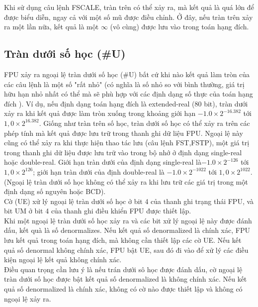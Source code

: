 	Khi sử dụng câu lệnh FSCALE, tràn trên có thể xảy ra, mà kết quả là quá lớn để được biểu diễn, ngay cả với một số mũ được điều chỉnh. Ở đây, nếu tràn trên xảy ra một lần nữa, kết quả là một $\mathbb{\infty}$ (vô cùng) được lưu vào trong toán hạng đích.	
	
		\subsection*{Tràn dưới số học (\#U)}
		FPU xảy ra ngoại lệ tràn dưới số học (\#U) bất cứ khi nào kết quả làm tròn của các câu lệnh là một số "rất nhỏ" (có nghĩa là số nhỏ so với bình thường, giá trị hữu hạn nhỏ nhất có thể mà sẽ phù hợp với các định dạng số thực của toán hạng đích ). Ví dụ, nếu định dạng toán hạng đích là extended-real (80 bit), tràn dưới xảy ra khi kết quả được làm tròn xuống trong khoảng giới hạn $-1.0 \times 2^{-16.382}$ tới $1,0 \times 2^{16.382}$. Giống như tràn trên số học, tràn dưới số học có thể xảy ra trên các phép tính mà kết quả được lưu trữ trong thanh ghi dữ liệu FPU. Ngoại lệ này cũng có thể xảy ra khi thực hiện thao tác lưu (câu lệnh FST,FSTP),  một giá trị trong thanh ghi dữ liệu được lưu trữ vào trong bộ nhớ ở định dạng single-real hoặc double-real. Giới hạn tràn dưới của định dạng single-real là$-1.0 \times 2^{-126}$ tới $1,0 \times 2^{126}$; giới hạn tràn dưới của định double-real là $-1.0 \times 2^{-1022}$ tới $1,0 \times 2^{1022}$. (Ngoại lệ tràn dưới số học không có thể xảy ra khi lưu trữ các giá trị trong một định dạng số nguyên hoặc BCD).\\
		
		Cờ (UE) xử lý ngoại lệ tràn dưới số học ở bit 4 của thanh ghi trạng thái FPU, và bit UM ở bit 4 của thanh ghi điều khiển FPU được thiết lập.\\
		
		Khi một ngoại lệ tràn dưới số học xảy ra và các bit xử lý ngoại lệ này được đánh dấu, kết quà là số denormalizes. Nếu kết quả số denormalized là chính xác, FPU lưu kết quả trong toán hạng đích, mà không cần thiết lập các cờ UE. Nếu kết quả số denormal không chính xác, FPU bật UE, sau đó đi vào để xử lý các điều kiện ngoại lệ kết quả không chính xác.\\
		
		 Điều quan trọng cần lưu ý là nếu trán dưới sô học được đánh dấu, cờ ngoại lệ tràn dưới số học được bật kết quả số denormalized là không chính xác. Nếu kết quả số denormalized là chính xác, không có cờ nào được thiết lập và không có ngoại lệ xảy ra.
		 
